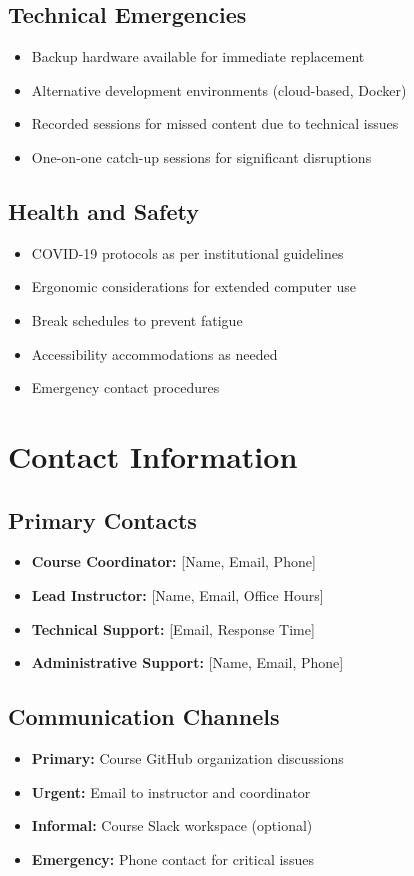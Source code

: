 \documentclass[11pt,a4paper]{article}
\begin{document}
\subsection{Technical Emergencies}
\begin{itemize}
    \item Backup hardware available for immediate replacement
    \item Alternative development environments (cloud-based, Docker)
    \item Recorded sessions for missed content due to technical issues
    \item One-on-one catch-up sessions for significant disruptions
\end{itemize}

\subsection{Health and Safety}
\begin{itemize}
    \item COVID-19 protocols as per institutional guidelines
    \item Ergonomic considerations for extended computer use
    \item Break schedules to prevent fatigue
    \item Accessibility accommodations as needed
    \item Emergency contact procedures
\end{itemize}

\section{Contact Information}

\subsection{Primary Contacts}
\begin{itemize}
    \item \textbf{Course Coordinator:} [Name, Email, Phone]
    \item \textbf{Lead Instructor:} [Name, Email, Office Hours]
    \item \textbf{Technical Support:} [Email, Response Time]
    \item \textbf{Administrative Support:} [Name, Email, Phone]
\end{itemize}

\subsection{Communication Channels}
\begin{itemize}
    \item \textbf{Primary:} Course GitHub organization discussions
    \item \textbf{Urgent:} Email to instructor and coordinator
    \item \textbf{Informal:} Course Slack workspace (optional)
    \item \textbf{Emergency:} Phone contact for critical issues
\end{itemize}
\end{document}
